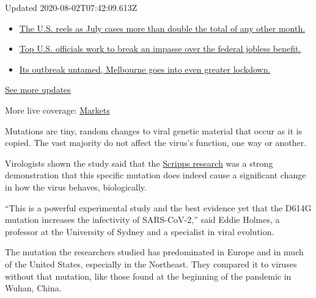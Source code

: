 Updated 2020-08-02T07:42:09.613Z

\begin{itemize}
\tightlist
\item
  \href{https://www.nytimes.com/2020/08/01/world/coronavirus-covid-19.html?action=click\&pgtype=Article\&state=default\&region=MAIN_CONTENT_1\&context=storylines_live_updates\#link-34047410}{The
  U.S. reels as July cases more than double the total of any other
  month.}
\item
  \href{https://www.nytimes.com/2020/08/01/world/coronavirus-covid-19.html?action=click\&pgtype=Article\&state=default\&region=MAIN_CONTENT_1\&context=storylines_live_updates\#link-780ec966}{Top
  U.S. officials work to break an impasse over the federal jobless
  benefit.}
\item
  \href{https://www.nytimes.com/2020/08/01/world/coronavirus-covid-19.html?action=click\&pgtype=Article\&state=default\&region=MAIN_CONTENT_1\&context=storylines_live_updates\#link-2bc8948}{Its
  outbreak untamed, Melbourne goes into even greater lockdown.}
\end{itemize}

\href{https://www.nytimes.com/2020/08/01/world/coronavirus-covid-19.html?action=click\&pgtype=Article\&state=default\&region=MAIN_CONTENT_1\&context=storylines_live_updates}{See
more updates}

More live coverage:
\href{https://www.nytimes.com/live/2020/07/31/business/stock-market-today-coronavirus?action=click\&pgtype=Article\&state=default\&region=MAIN_CONTENT_1\&context=storylines_live_updates}{Markets}

Mutations are tiny, random changes to viral genetic material that occur
as it is copied. The vast majority do not affect the virus's function,
one way or another.

Virologists shown the study said that the
\href{https://www.scripps.edu/news-and-events/press-room/2020/20200612-choe-farzan-coronavirus-spike-mutation.html}{Scripps
research} was a strong demonstration that this specific mutation does
indeed cause a significant change in how the virus behaves,
biologically.

``This is a powerful experimental study and the best evidence yet that
the D614G mutation increases the infectivity of SARS-CoV-2,'' said Eddie
Holmes, a professor at the University of Sydney and a specialist in
viral evolution.

The mutation the researchers studied has predominated in Europe and in
much of the United States, especially in the Northeast. They compared it
to viruses without that mutation, like those found at the beginning of
the pandemic in Wuhan, China.

